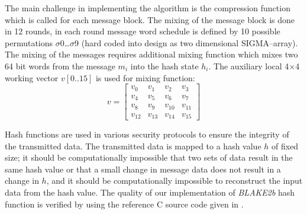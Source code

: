 \documentclass[%
	a4paper,
]
{article}
\begin{document}
The main challenge in implementing the algorithm is the compression function which is called for each message block. The mixing of the message block is done in 12 rounds, in each round message word schedule is defined by 10 possible permutations $\sigma$0…$\sigma$9 (hard coded into design as two dimensional SIGMA–array). The mixing of the messages requires additional mixing function which mixes two 64 bit words from the message $m_i$ into the hash state $h_i$. The auxiliary local 4$\times$4 working vector $v[0..15]$ is used for mixing function:
\[
   v=
  \left[ {\begin{array}{cccc}
   v_0 & v_1 &v_2 & v_3 \\
   v_4 & v_5 &v_6 & v_7\\
   v_8 & v_9 &v_{10} & v_{11}\\
   v_{12} & v_{13} &v_{14} & v_{15}
  \end{array} } \right]
\]
	    
Hash functions are used in various security protocols to ensure the integrity of the transmitted data. The transmitted data is mapped to a hash value $h$ of fixed size; it should be computationally impossible that two sets of data result in the same hash value or that a small change in message data does not result in a change in $h$, and it should be computationally impossible to reconstruct the input data from the hash value. The quality of our implementation of \emph{BLAKE2b} hash function is verified by using the reference C source code given in \autocite{rfc7693}.


%
%
%
\end{document}
